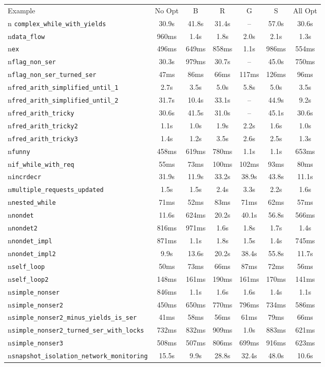 \begin{tabular}{lcccccc}
\toprule
Example & No Opt & B & R & G & S & All Opt \\n\midrule
\texttt{complex\_while\_with\_yields} & 30.9s & 41.8s & 31.4s & -- & 57.0s & 30.6s \\n\texttt{data\_flow} & 960ms & 1.4s & 1.8s & 2.0s & 2.1s & 1.3s \\n\texttt{ex} & 496ms & 649ms & 858ms & 1.1s & 986ms & 554ms \\n\texttt{flag\_non\_ser} & 30.3s & 979ms & 30.7s & -- & 45.0s & 750ms \\n\texttt{flag\_non\_ser\_turned\_ser} & 47ms & 86ms & 66ms & 117ms & 126ms & 96ms \\n\texttt{fred\_arith\_simplified\_until\_1} & 2.7s & 3.5s & 5.0s & 5.8s & 5.0s & 3.5s \\n\texttt{fred\_arith\_simplified\_until\_2} & 31.7s & 10.4s & 33.1s & -- & 44.9s & 9.2s \\n\texttt{fred\_arith\_tricky} & 30.6s & 41.5s & 31.0s & -- & 45.1s & 30.6s \\n\texttt{fred\_arith\_tricky2} & 1.1s & 1.0s & 1.9s & 2.2s & 1.6s & 1.0s \\n\texttt{fred\_arith\_tricky3} & 1.4s & 1.2s & 3.5s & 2.6s & 2.5s & 1.3s \\n\texttt{funny} & 458ms & 619ms & 780ms & 1.1s & 1.1s & 653ms \\n\texttt{if\_while\_with\_req} & 55ms & 73ms & 100ms & 102ms & 93ms & 80ms \\n\texttt{incrdecr} & 31.9s & 11.9s & 33.2s & 38.9s & 43.8s & 11.1s \\n\texttt{multiple\_requests\_updated} & 1.5s & 1.5s & 2.4s & 3.3s & 2.2s & 1.6s \\n\texttt{nested\_while} & 71ms & 52ms & 83ms & 71ms & 62ms & 57ms \\n\texttt{nondet} & 11.6s & 624ms & 20.2s & 40.1s & 56.8s & 566ms \\n\texttt{nondet2} & 816ms & 971ms & 1.6s & 1.8s & 1.7s & 1.4s \\n\texttt{nondet\_impl} & 871ms & 1.1s & 1.8s & 1.5s & 1.4s & 745ms \\n\texttt{nondet\_impl2} & 9.9s & 13.6s & 20.2s & 38.4s & 55.8s & 11.7s \\n\texttt{self\_loop} & 50ms & 73ms & 66ms & 87ms & 72ms & 56ms \\n\texttt{self\_loop2} & 148ms & 161ms & 190ms & 161ms & 170ms & 141ms \\n\texttt{simple\_nonser} & 846ms & 1.1s & 1.6s & 1.6s & 1.4s & 1.1s \\n\texttt{simple\_nonser2} & 450ms & 650ms & 770ms & 796ms & 734ms & 586ms \\n\texttt{simple\_nonser2\_minus\_yields\_is\_ser} & 41ms & 58ms & 56ms & 61ms & 79ms & 66ms \\n\texttt{simple\_nonser2\_turned\_ser\_with\_locks} & 732ms & 832ms & 909ms & 1.0s & 883ms & 621ms \\n\texttt{simple\_nonser3} & 508ms & 507ms & 806ms & 699ms & 916ms & 623ms \\n\texttt{snapshot\_isolation\_network\_monitoring} & 15.5s & 9.9s & 28.8s & 32.4s & 48.0s & 10.6s 
\end{tabular}
